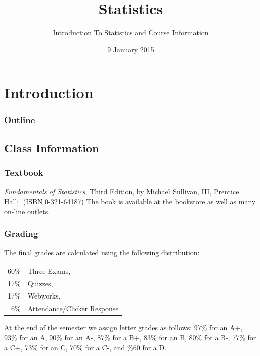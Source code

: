 
\section{Introduction}

\title{Statistics}
\subtitle{Introduction To Statistics and Course Information}

\date{9 January 2015}

\begin{frame}
  \titlepage
\end{frame}

\begin{frame}
  \frametitle{Outline}
  \tableofcontents[hideothersubsections,sectionstyle=show/hide]
\end{frame}


\subsection{Class Information}


\begin{frame}
  \frametitle{Textbook}

{\em Fundamentals of Statistics}, Third Edition, by
  Michael Sullivan, III, Prentice Hall;. (ISBN 0-321-64187) The book
  is available at the bookstore as well as many on-line outlets.


\end{frame}


\begin{frame}
  \frametitle{Grading}

  
  The final grades are calculated using the following distribution: 

  \vfill

    \begin{tabular}[t]{rl}
      60\% & Three Exams, \\
      17\% & Quizzes, \\
      17\% & Webworks, \\
      6\%  & Attendance/Clicker Response 
    \end{tabular}

    \vfill
  
    At the end of the semester we assign letter grades as follows:
    97\% for an A+, 93\% for an A, 90\% for an A-, 
    87\% for a  B+, 83\% for an B, 80\% for a B-, 
    77\% for a  C+, 73\% for an C, 70\% for a C-, 
    and \%60 for a D.


\end{frame}



